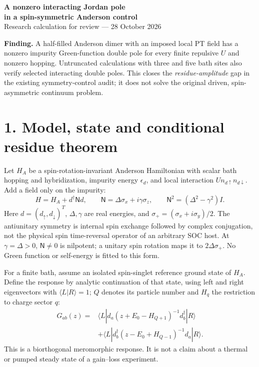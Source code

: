 \documentclass[11pt,a4paper]{article}
\newcommand{\N}{\mathsf N}
\begin{document}
\begin{center}
{\Large\bfseries A nonzero interacting Jordan pole\\in a spin-symmetric Anderson control}\\[5pt]
Research calculation for review --- 28 October 2026
\end{center}

\textbf{Finding.} A half-filled Anderson dimer with an imposed local PT field
has a nonzero impurity Green-function double pole for every finite repulsive
$U$ and nonzero hopping. Untruncated calculations with three and five bath
sites also verify selected interacting double poles. This closes the
\emph{residue-amplitude} gap in the existing symmetry-control audit; it does
not solve the original driven, spin-asymmetric continuum problem.

\section*{1. Model, state and conditional residue theorem}
Let $H_A$ be a spin-rotation-invariant Anderson Hamiltonian with scalar bath
hopping and hybridization, impurity energy $\epsilon_d$, and local interaction
$Un_{d\uparrow}n_{d\downarrow}$. Add a field only on the impurity:
\begin{equation}
 H=H_A+d^\dagger\N d,\qquad
 \N=\Delta\sigma_x+i\gamma\sigma_z,\qquad
 \N^2=(\Delta^2-\gamma^2)I .
\end{equation}
Here $d=(d_\uparrow,d_\downarrow)^T$, $\Delta,\gamma$ are real energies, and
$\sigma_+=(\sigma_x+i\sigma_y)/2$. The antiunitary symmetry is internal
spin exchange followed by complex conjugation, not the physical spin
time-reversal operator of an arbitrary SOC host. At $\gamma=\Delta>0$,
$\N\ne0$ is nilpotent; a unitary spin rotation maps it to
$2\Delta\sigma_+$. No Green function or self-energy is fitted to this form.

For a finite bath, assume an isolated spin-singlet reference ground state
of $H_A$. Define the response by analytic continuation of that state, using
left and right eigenvectors with $\langle L|R\rangle=1$; $Q$ denotes its
particle number and $H_q$ the restriction to charge sector $q$:
\begin{align}
G_{ab}(z)={}&\langle L|d_a(z+E_0-H_{Q+1})^{-1}d_b^\dagger|R\rangle\nonumber\\
 &+\langle L|d_b^\dagger(z-E_0+H_{Q-1})^{-1}d_a|R\rangle .
\end{align}
This is a biorthogonal meromorphic response. It is not a claim about a
thermal or pumped steady state of a gain--loss experiment.
\end{document}
